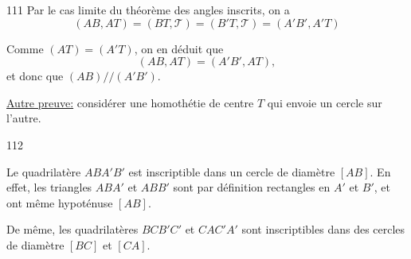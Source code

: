 \begin{Soln}{111}
Par le cas limite du théorème des angles inscrits, on a
\[ (AB,AT) = (BT,\mathcal T)=(B'T,\mathcal T)=(A'B',A'T)\]

Comme $(AT) = (A'T)$, on en déduit que
\[ (AB,AT) = (A'B',AT),\]
et donc que $(AB)//(A'B')$.

\underline{Autre preuve:} considérer une homothétie de centre $T$ qui envoie un cercle sur l'autre.

\end{Soln}
\begin{Soln}{112}

Le quadrilatère $ABA'B'$ est inscriptible dans un cercle de diamètre $[AB]$. En effet, les triangles $ABA'$ et $ABB'$ sont par définition rectangles en $A'$ et $B'$, et ont même hypoténuse $[AB]$.

De même, les quadrilatères $BCB'C'$ et $CAC'A'$ sont inscriptibles dans des cercles de diamètre $[BC]$ et $[CA]$.

\begin{center}


\end{center}
\end{Soln}
